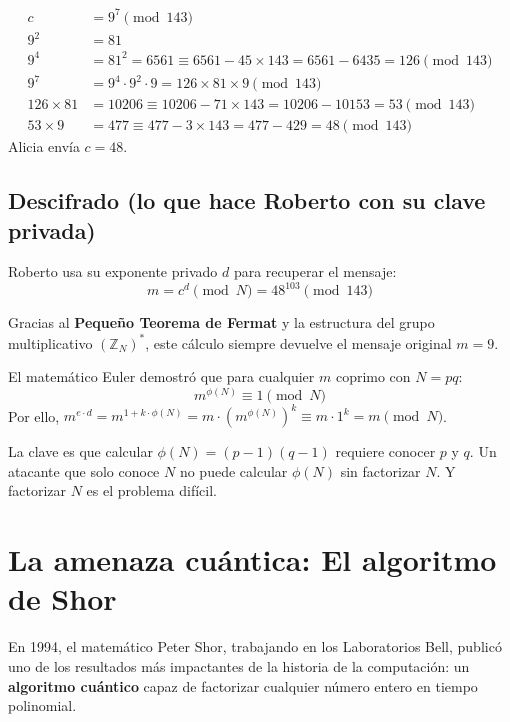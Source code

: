 \begin{ejemplonumerico}[Alicia cifra el mensaje $m=9$]
\begin{align*}
c &= 9^7 \pmod{143} \\
9^2 &= 81 \\
9^4 &= 81^2 = 6561 \equiv 6561 - 45 \times 143 = 6561 - 6435 = 126 \pmod{143} \\
9^7 &= 9^4 \cdot 9^2 \cdot 9 = 126 \times 81 \times 9 \pmod{143} \\
126 \times 81 &= 10206 \equiv 10206 - 71 \times 143 = 10206 - 10153 = 53 \pmod{143} \\
53 \times 9 &= 477 \equiv 477 - 3 \times 143 = 477 - 429 = 48 \pmod{143}
\end{align*}
Alicia envía $c = 48$.
\end{ejemplonumerico}

\subsection*{Descifrado (lo que hace Roberto con su clave privada)}

Roberto usa su exponente privado $d$ para recuperar el mensaje:
\[
m = c^d \pmod N = 48^{103} \pmod{143}
\]

Gracias al \textbf{Pequeño Teorema de Fermat} y la estructura del grupo multiplicativo $(\mathbb{Z}_N)^*$, este cálculo siempre devuelve el mensaje original $m = 9$.

\begin{intuicion}
El matemático Euler demostró que para cualquier $m$ coprimo con $N = pq$:
\[
m^{\phi(N)} \equiv 1 \pmod N
\]
Por ello, $m^{e \cdot d} = m^{1 + k \cdot \phi(N)} = m \cdot (m^{\phi(N)})^k \equiv m \cdot 1^k = m \pmod N$.

La clave es que calcular $\phi(N) = (p-1)(q-1)$ requiere conocer $p$ y $q$. Un atacante que solo conoce $N$ no puede calcular $\phi(N)$ sin factorizar $N$. Y factorizar $N$ es el problema difícil.
\end{intuicion}

\section{La amenaza cuántica: El algoritmo de Shor}

En 1994, el matemático Peter Shor, trabajando en los Laboratorios Bell, publicó uno de los resultados más impactantes de la historia de la computación: un \textbf{algoritmo cuántico} capaz de factorizar cualquier número entero en tiempo polinomial.

